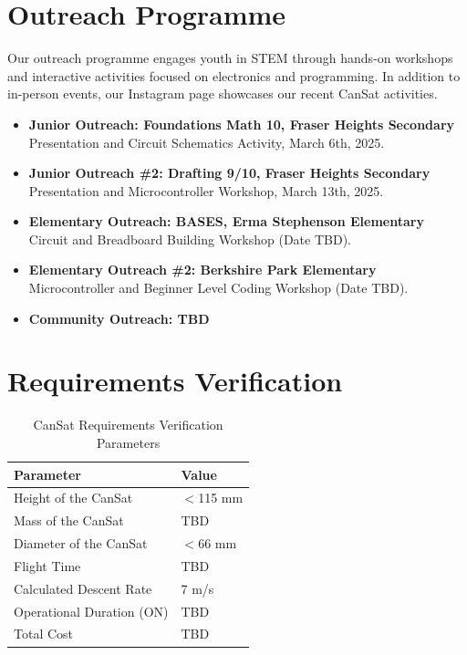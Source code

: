 \documentclass{article}
\begin{document}
\section{Outreach Programme}
Our outreach programme engages youth in STEM through hands-on workshops and interactive activities focused on electronics and programming. In addition to in-person events, our Instagram page showcases our recent CanSat activities.
\begin{itemize}
    \item \textbf{Junior Outreach: Foundations Math 10, Fraser Heights Secondary}\\
    Presentation and Circuit Schematics Activity, March 6th, 2025.
    \item \textbf{Junior Outreach \#2: Drafting 9/10, Fraser Heights Secondary}\\
    Presentation and Microcontroller Workshop, March 13th, 2025.
    \item \textbf{Elementary Outreach: BASES, Erma Stephenson Elementary}\\
    Circuit and Breadboard Building Workshop (Date TBD).
    \item \textbf{Elementary Outreach \#2: Berkshire Park Elementary}\\
    Microcontroller and Beginner Level Coding Workshop (Date TBD).
    \item \textbf{Community Outreach: TBD}
\end{itemize}

\section{Requirements Verification}
\begin{table}[H]
\centering
\begin{tabular}{|l|l|}
\hline
\textbf{Parameter} & \textbf{Value} \\ \hline
Height of the CanSat & $<$115 mm \\ \hline
Mass of the CanSat & TBD \\ \hline
Diameter of the CanSat & $<$66 mm \\ \hline
Flight Time & TBD \\ \hline
Calculated Descent Rate & 7 m/s \\ \hline
Operational Duration (ON) & TBD \\ \hline
Total Cost & TBD \\ \hline
\end{tabular}
\caption{CanSat Requirements Verification Parameters}
\end{table}
\end{document}
